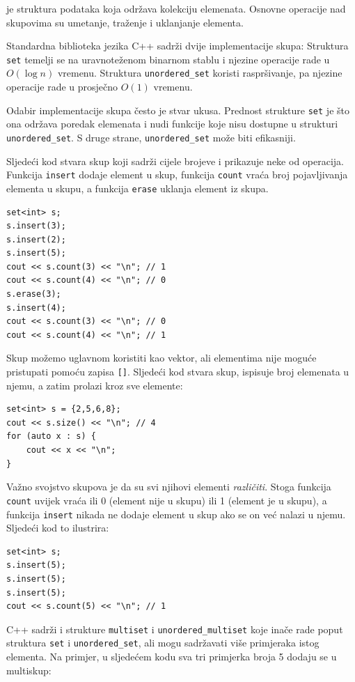 
 je struktura podataka koja
održava kolekciju elemenata.
Osnovne operacije nad skupovima su umetanje,
traženje i uklanjanje elementa.

Standardna biblioteka jezika C++ sadrži dvije
implementacije skupa:
Struktura \texttt{set} temelji se na uravnoteženom
binarnom stablu i njezine operacije rade u $O(\log n)$ vremenu.
Struktura \texttt{unordered\_set} koristi raspršivanje,
pa njezine operacije rade u prosječno $O(1)$ vremenu.

Odabir implementacije skupa
često je stvar ukusa.
Prednost strukture \texttt{set}
je što ona održava poredak elemenata
i nudi funkcije koje nisu dostupne
u strukturi \texttt{unordered\_set}.
S druge strane, \texttt{unordered\_set}
može biti efikasniji.

Sljedeći kod stvara skup
koji sadrži cijele brojeve
i prikazuje neke od operacija.
Funkcija \texttt{insert} dodaje element u skup,
funkcija \texttt{count} vraća broj pojavljivanja
elementa u skupu,
a funkcija \texttt{erase} uklanja element iz skupa.

\begin{lstlisting}
set<int> s;
s.insert(3);
s.insert(2);
s.insert(5);
cout << s.count(3) << "\n"; // 1
cout << s.count(4) << "\n"; // 0
s.erase(3);
s.insert(4);
cout << s.count(3) << "\n"; // 0
cout << s.count(4) << "\n"; // 1
\end{lstlisting}

Skup možemo uglavnom koristiti kao vektor,
ali elementima nije moguće pristupati
pomoću zapisa \texttt{[]}.
Sljedeći kod stvara skup,
ispisuje broj elemenata u njemu, a zatim
prolazi kroz sve elemente:
\begin{lstlisting}
set<int> s = {2,5,6,8};
cout << s.size() << "\n"; // 4
for (auto x : s) {
    cout << x << "\n";
}
\end{lstlisting}

Važno svojstvo skupova je
da su svi njihovi elementi \emph{različiti}.
Stoga funkcija \texttt{count} uvijek vraća
ili 0 (element nije u skupu)
ili 1 (element je u skupu),
a funkcija \texttt{insert} nikada ne dodaje
element u skup ako se on
već nalazi u njemu.
Sljedeći kod to ilustrira:

\begin{lstlisting}
set<int> s;
s.insert(5);
s.insert(5);
s.insert(5);
cout << s.count(5) << "\n"; // 1
\end{lstlisting}

C++ sadrži i strukture
\texttt{multiset} i \texttt{unordered\_multiset}
koje inače rade poput struktura \texttt{set}
i \texttt{unordered\_set},
ali mogu sadržavati više primjeraka istog elementa.
Na primjer, u sljedećem kodu sva tri primjerka
broja 5 dodaju se u multiskup:

